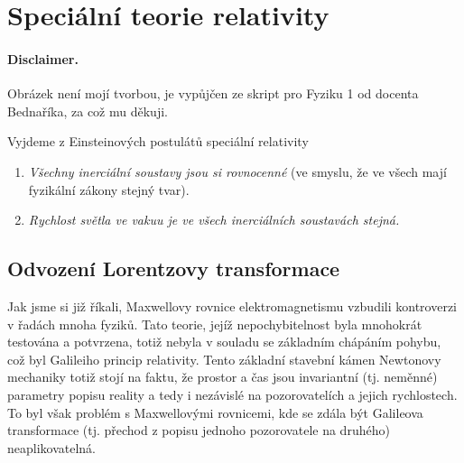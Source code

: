 \documentclass[11pt,a4paper]{report}
\theoremstyle{theorem}
\theoremstyle{remark}
\theoremstyle{definition}
\begin{document}
	
	
	\section*{Speciální teorie relativity}
		
		\paragraph{Disclaimer.} Obrázek není mojí tvorbou, je vypůjčen ze skript pro Fyziku 1 od docenta Bednaříka, za což mu děkuji.
		
		\noindent
		Vyjdeme z Einsteinových postulátů speciální relativity
		\begin{enumerate}
			\item \textit{Všechny inerciální soustavy jsou si rovnocenné} (ve smyslu, že ve všech mají fyzikální zákony stejný tvar).
			
			\item \textit{Rychlost světla ve vakuu je ve všech inerciálních soustavách stejná.}
		\end{enumerate}
		
		\subsection*{Odvození Lorentzovy transformace}
			
			Jak jsme si již říkali, Maxwellovy rovnice elektromagnetismu vzbudili kontroverzi v řadách mnoha fyziků. Tato teorie, jejíž nepochybitelnost byla mnohokrát testována a potvrzena, totiž nebyla v souladu se základním chápáním pohybu, což byl Galileiho princip relativity. Tento základní stavební kámen Newtonovy mechaniky totiž stojí na faktu, že prostor a čas jsou invariantní (tj. neměnné) parametry popisu reality a tedy i nezávislé na pozorovatelích a jejich rychlostech. To byl však problém s Maxwellovými rovnicemi, kde se zdála být Galileova transformace (tj. přechod z popisu jednoho pozorovatele na druhého) neaplikovatelná.
			
\end{document}

